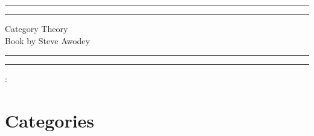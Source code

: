 \documentclass[a4paper, 11pt]{book}
\theoremstyle{plain}
\theoremstyle{plain}
\begin{document}
  \begin{titlepage}
	\centering %
	\scshape %
	\vspace*{1.5\baselineskip} %

	\rule{13cm}{1.6pt}\vspace*{-\baselineskip}\vspace*{2pt} %
	\rule{13cm}{0.4pt} %
	
		\vspace{0.75\baselineskip} %
	{	\Huge Category Theory\\ 
			\vspace{4mm}
		Book by Steve Awodey \\	}
		\vspace{0.75\baselineskip} %
	\rule{13cm}{0.4pt}\vspace*{-\baselineskip}\vspace{3.2pt} %
	\rule{13cm}{1.6pt} %
	
		\vspace{1.75\baselineskip} %
	{\large : 
		\vspace*{1.2\baselineskip}
	} \\
	\vfill

\end{titlepage}
\begingroup
\let\cleardoublepage\clearpage
\tableofcontents
\endgroup

\chapter{Categories}
\end{document}
